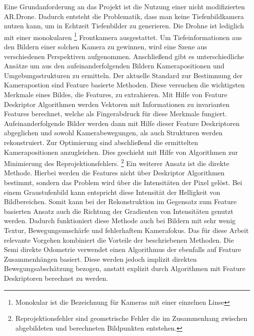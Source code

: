 Eine Grundanforderung an das Projekt ist die Nutzung einer nicht modifizierten AR.Drone. Dadurch entsteht die Problematik, dass man keine Tiefenbildkamera nutzen kann, um in Echtzeit Tiefenbilder zu generieren. Die Drohne ist lediglich mit einer monokularen \footnote{Monokular ist die Bezeichnung für Kameras mit einer einzelnen Linse} Frontkamera ausgestattet. \newline
Um Tiefeinformationen aus den Bildern einer solchen Kamera zu gewinnen, wird eine Szene aus verschiedenen Perspektiven aufgenommen. Anschließend gibt es unterschiedliche Ansätze um aus den aufeinanderfolgenden Bildern Kamerapositionen und Umgebungsstrukturen zu ermitteln. \newline
Der aktuelle Standard zur Bestimmung der Kamerapostion sind Feature basierte Methoden. Diese versuchen die wichtigsten Merkmale eines Bildes, die Features, zu extrahieren. Mit Hilfe von Feature Deskriptor Algorithmen werden Vektoren mit Informationen zu invarianten Features berechnet, welche als Fingerabdruck für diese Merkmale fungiert. \newline
Aufeinanderfolgende Bilder werden dann mit Hilfe dieser Feature Deskriptoren abgeglichen und sowohl Kamerabewegungen, als auch Strukturen werden rekonstruiert. Zur Optimierung sind abschließend die ermittelten Kamerapositionen anzugleichen. Dies geschieht mit Hilfe von Algorithmen zur Minimierung des Reprojektionsfehlers. \footnote{Reprojektionsfehler sind geometrische Fehler die im Zusammenhang zwischen abgebildeten und berechneten Bildpunkten entstehen.} 
\newline
Ein weiterer Ansatz ist die direkte Methode. Hierbei werden die Features nicht über Deskriptor Algorithmen bestimmt, sondern das Problem wird über die Intensitäten der Pixel gelöst. Bei einem Graustufenbild kann entspricht diese Intensität der Helligkeit von Bildbereichen. \newline
Somit kann bei der Rekonstruktion im Gegensatz zum Feature basierten Ansatz auch die Richtung der Gradienten von Intensitäten genutzt werden. Dadurch funktioniert diese Methode auch bei Bildern mit sehr wenig Textur, Bewegungsunschärfe und fehlerhaftem Kamerafokus. \newline
Das für diese Arbeit relevante Vorgehen kombiniert die Vorteile der beschriebenen Methoden. Die Semi direkte Odometrie %
verwendet einen Algorithmus der ebenfalls auf Feature Zusammenhängen basiert. Diese werden jedoch implizit direkten Bewegungsabschätzung bezogen, anstatt explizit durch Algorithmen mit Feature Deskriptoren berechnet zu werden. \newline
